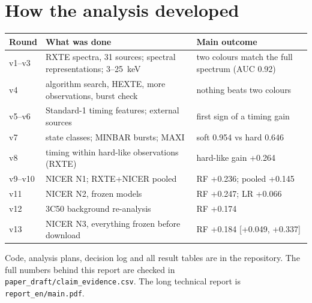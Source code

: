 \documentclass[11pt,a4paper]{article}
\begin{document}
\appendix
\section{How the analysis developed}
\begin{center}\small
\begin{tabularx}{\textwidth}{@{}l >{\raggedright\arraybackslash}X >{\raggedright\arraybackslash}X@{}}
\toprule
Round & What was done & Main outcome \\
\midrule
v1--v3 & RXTE spectra, 31 sources; spectral representations; 3--25~keV & two colours match the full spectrum (AUC 0.92) \\
v4 & algorithm search, HEXTE, more observations, burst check & nothing beats two colours \\
v5--v6 & Standard-1 timing features; external sources & first sign of a timing gain \\
v7 & state classes; MINBAR bursts; MAXI & soft 0.954 vs hard 0.646 \\
v8 & timing within hard-like observations (RXTE) & hard-like gain +0.264 \\
v9--v10 & NICER N1; RXTE+NICER pooled & RF +0.236; pooled +0.145 \\
v11 & NICER N2, frozen models & RF +0.247; LR +0.066 \\
v12 & 3C50 background re-analysis & RF +0.174 \\
v13 & NICER N3, everything frozen before download & RF +0.184 [+0.049, +0.337] \\
\bottomrule
\end{tabularx}
\end{center}

Code, analysis plans, decision log and all result tables are in the repository. The full numbers behind this report
are checked in \texttt{paper\_draft/claim\_evidence.csv}. The long technical report is \texttt{report\_en/main.pdf}.



\end{document}
